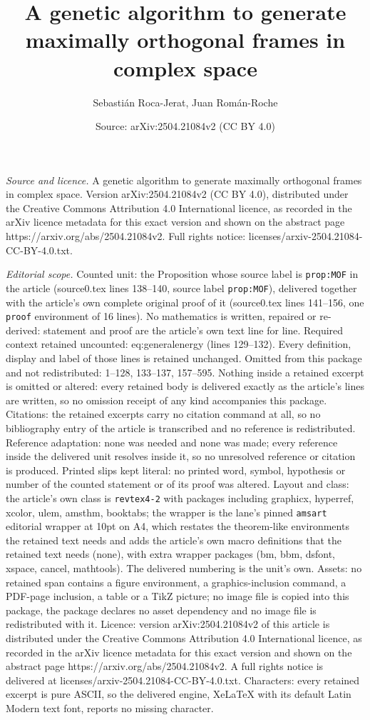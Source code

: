 \documentclass[10pt,a4paper]{amsart}
\title[A genetic algorithm to generate maximally orthogonal frames ]{A genetic algorithm to generate maximally orthogonal frames in complex space}
\author{Sebasti\'an Roca-Jerat, Juan Rom\'an-Roche}
\date{Source: arXiv:2504.21084v2 (CC BY 4.0)}
\begin{document}
\maketitle

\noindent\emph{Source and licence.} A genetic algorithm to generate maximally orthogonal frames in complex space. Version arXiv:2504.21084v2 (CC BY 4.0), distributed under the Creative Commons Attribution 4.0 International licence, as recorded in the arXiv licence metadata for this exact version and shown on the abstract page https://arxiv.org/abs/2504.21084v2. Full rights notice: licenses/arxiv-2504.21084-CC-BY-4.0.txt.\par\smallskip

\noindent\textit{Editorial scope.} Counted unit: the Proposition whose source label is \texttt{prop:MOF} in the article (source0.tex lines 138--140, source label \texttt{prop:MOF}), delivered together with the article's own complete original proof of it (source0.tex lines 141--156, one \texttt{proof} environment of 16 lines). No mathematics is written, repaired or re-derived: statement and proof are the article's own text line for line. Required context retained uncounted: eq:generalenergy (lines 129--132). Every definition, display and label of those lines is retained unchanged. Omitted from this package and not redistributed: 1--128, 133--137, 157--595. Nothing inside a retained excerpt is omitted or altered: every retained body is delivered exactly as the article's lines are written, so no omission receipt of any kind accompanies this package. Citations: the retained excerpts carry no citation command at all, so no bibliography entry of the article is transcribed and no reference is redistributed. Reference adaptation: none was needed and none was made; every reference inside the delivered unit resolves inside it, so no unresolved reference or citation is produced. Printed slips kept literal: no printed word, symbol, hypothesis or number of the counted statement or of its proof was altered. Layout and class: the article's own class is \texttt{revtex4-2} with packages including graphicx, hyperref, xcolor, ulem, amsthm, booktabs; the wrapper is the lane's pinned \texttt{amsart} editorial wrapper at 10pt on A4, which restates the theorem-like environments the retained text needs and adds the article's own macro definitions that the retained text needs (none), with extra wrapper packages (bm, bbm, dsfont, xspace, cancel, mathtools). The delivered numbering is the unit's own. Assets: no retained span contains a figure environment, a graphics-inclusion command, a PDF-page inclusion, a table or a TikZ picture; no image file is copied into this package, the package declares no asset dependency and no image file is redistributed with it. Licence: version arXiv:2504.21084v2 of this article is distributed under the Creative Commons Attribution 4.0 International licence, as recorded in the arXiv licence metadata for this exact version and shown on the abstract page https://arxiv.org/abs/2504.21084v2. A full rights notice is delivered at licenses/arxiv-2504.21084-CC-BY-4.0.txt. Characters: every retained excerpt is pure ASCII, so the delivered engine, XeLaTeX with its default Latin Modern text font, reports no missing character.
\end{document}
